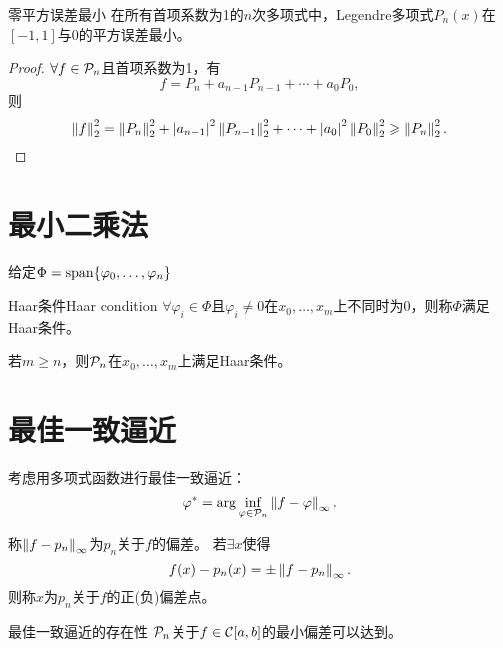 \begin{theorem}
    {零平方误差最小}{}
    在所有首项系数为1的$n$次多项式中，Legendre多项式$P_n(x)$在$[-1,1]$与0的平方误差最小。
\end{theorem}

\begin{proof}
    $\forall f\in\mathcal P_n$且首项系数为1，有
    \[
        f=P_n+a_{n-1}P_{n-1}+\cdots+a_0P_0,
    \]
    则
    \[
        \left\lVert f\right\rVert_2^2=\left\lVert P_n\right\rVert_2^2+\left\lvert a_{n-1}\right\rvert^2\left\lVert P_{n-1}\right\rVert_2^2+\cdots+\left\lvert a_0\right\rvert^2\left\lVert P_0\right\rVert_2^2\geqslant\left\lVert P_n\right\rVert_2^2.
        \qedhere
    \]
\end{proof}

\section{最小二乘法}
\label{sec:least squares algorithm}

给定$\Phi=\operatorname{span}\{\varphi_0,\ldots,\varphi_n\}$

\begin{definition}
    {Haar条件}{Haar condition}
    $\forall \varphi_i\in\Phi$且$\varphi_i\neq 0$在$x_0,\ldots,x_m$上不同时为0，则称$\Phi$满足Haar条件。
\end{definition}

\begin{example}
    {}{}
    若$m\geq n$，则$\mathcal P_n$在$x_0,\ldots,x_m$上满足Haar条件。
\end{example}

\section{最佳一致逼近}
\label{sec:optimal uniform approximation}

考虑用多项式函数进行最佳一致逼近：
\begin{equation}
    \varphi^*=\arg\inf_{\varphi\in\mathcal P_n}\left\lVert f-\varphi\right\rVert_\infty.
\end{equation}

\begin{definition}
    {}{}
    称$\left\lVert f-p_n\right\rVert_\infty$为$p_n$关于$f$的偏差。
    若$\exists x$使得
    \begin{equation}
        f(x)-p_n(x)=\pm\left\lVert f-p_n\right\rVert_\infty.
    \end{equation}
    则称$x$为$p_n$关于$f$的正(负)偏差点。
\end{definition}

\begin{theorem}
    {最佳一致逼近的存在性}{}
    $\mathcal P_n$关于$f\in\mathcal C[a,b]$的最小偏差可以达到。
\end{theorem}

